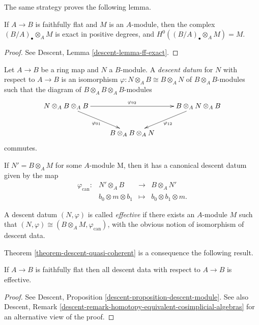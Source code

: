 \medskip\noindent
The same strategy proves the following lemma.

\begin{lemma}
\label{lemma-descent-modules}
If $A \to B$ is faithfully flat and $M$ is an $A$-module, then the
complex $(B/A)_\bullet \otimes_A M$ is exact in positive degrees, and
$H^0((B/A)_\bullet \otimes_A M) = M$.
\end{lemma}

\begin{proof}
See Descent, Lemma \ref{descent-lemma-ff-exact}.
\end{proof}

\begin{definition}
\label{definition-descent-datum-modules}
Let $A \to B$ be a ring map and $N$ a $B$-module. A {\it descent datum} for
$N$ with respect to $A \to B$ is an isomorphism $\varphi: N\otimes_A B \cong
B\otimes_A N$ of $B\otimes_A B$-modules such that the diagram of $B\otimes_A B
\otimes_A B$-modules
$$
\xymatrix{
{N \otimes_A B \otimes_A B} \ar_{\varphi_{01}}[dr] \ar^{\varphi_{02}}[rr] & &
{B \otimes_A N \otimes_A B}\ar^{\varphi_{12}}[dl] \\
& {B \otimes_A B \otimes_A N}
}
$$
commutes.
\end{definition}

\noindent
If $N' = B \otimes_A M$ for some $A$-module M, then it has a canonical descent
datum given by the map
$$
\begin{matrix}
\varphi_\text{can}: & N' \otimes_A B & \to & B \otimes_A N' \\
& b_0 \otimes m \otimes b_1 & \mapsto & b_0 \otimes b_1 \otimes m.
\end{matrix}
$$

\begin{definition}
\label{definition-effective-modules}
A descent datum $(N,\varphi)$ is called {\it effective} if there exists an
$A$-module $M$ such that $(N,\varphi) \cong (B\otimes_A M,
\varphi_\text{can})$, with the obvious notion of isomorphism of descent data.
\end{definition}

\noindent
Theorem \ref{theorem-descent-quasi-coherent} is a consequence the
following result.

\begin{theorem}
\label{theorem-descent-modules}
If $A \to B$ is faithfully flat then all descent data with respect to $A\to B$
is effective.
\end{theorem}

\begin{proof}
See
Descent, Proposition \ref{descent-proposition-descent-module}.
See also
Descent, Remark \ref{descent-remark-homotopy-equivalent-cosimplicial-algebras}
for an alternative view of the proof.
\end{proof}

